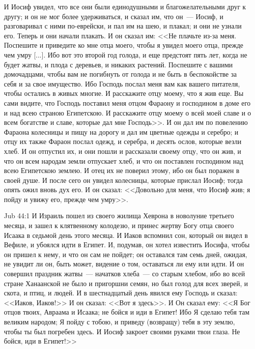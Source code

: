И Иосиф увидел, что все они были единодушными и
благожелательными друг к другу; и он не мог более
удерживаться, и сказал им, что он~--- Иосиф, и
разговаривал с ними по-еврейски, и пал им на шею, и
плакал; и они не узнали его. Теперь и они начали
плакать. И он сказал им: <<Не плачьте из-за меня.
Поспешите и приведите ко мне отца моего, чтобы я
увидел моего отца, прежде чем умру [...]. Ибо вот это
второй год голода, и еще предстоят пять лет, когда
не будет жатвы, и плода с деревьев, и никаких
растений. Поспешите с вашими домочадцами, чтобы
вам не погибнуть от голода и не быть в
беспокойстве за себя и за свое имущество. Ибо
Господь послал меня вам как вашего питателя,
чтобы остались в живых многие. И расскажите отцу
моему, что я жив еще. Вы сами видите, что Господь
поставил меня отцом Фараону и господином в доме
его и над всею страною Египетскою. И расскажите
отцу моему о всей моей славе и о всем богатстве и
славе, которые дал мне Господь>>. И он дал им по
повелению Фараона колесницы и пищу на дорогу и
дал им цветные одежды и серебро; и отцу их также
Фараон послал одежд, и серебра, и десять ослов,
которые везли хлеб. И он отпустил их, и они пошли и
рассказали своему отцу, что он жив, и что он всем
народам земли отпускает хлеб, и что он поставлен
господином над всею Египетскою землею. И отец их
не поверил этому, ибо он был поражен в своей душе.
И после сего он увидел колесницы, которые прислал
Иосиф; тогда опять ожил вновь дух его. И он сказал:
<<Довольно для меня, что Иосиф жив; я пойду и
увижу его, прежде чем умру>>.

\vs Jub 44:1
И Израиль пошел из своего жилища Хеврона в
новолуние третьего месяца, и зашел к клятвенному
колодезю, и принес жертву Богу отца своего Исаака
в седьмой день этого месяца. И Иаков вспомнил сон,
который он видел в Вефиле, и убоялся идти в
Египет. И, подумав, он хотел известить Иосифа,
чтобы он пришел к нему, и что он сам не пойдет; он
оставался там семь дней, ожидая, не увидит ли
он, быть может, видение о том, оставаться ли ему
или идти. И он совершил праздник жатвы~--- начатков
хлеба~--- со старым хлебом, ибо во всей стране
Ханаанской не было и пригоршни семян, но был
голод для всех зверей, и скота, и птиц, и людей. И в
шестнадцатый день явился ему Господь и сказал:
<<Иаков, Иаков!>> И он сказал: <<Вот я
здесь>>. И Он сказал ему: <<Я Бог отцов твоих,
Авраама и Исаака; не бойся и иди в Египет! Ибо Я
сделаю тебя там великим народом; Я пойду с тобою,
и приведу (возвращу) тебя в эту землю, чтобы ты был
погребен здесь. И Иосиф закроет своими руками
твои глаза. Не бойся, иди в Египет!>>

